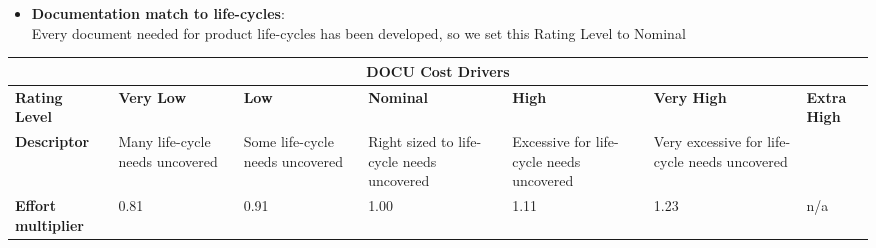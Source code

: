 \begin{itemize}
\item \textbf{Documentation match to life-cycles}:\\
Every document needed for product life-cycles has been developed, so we set this Rating Level to Nominal
\end{itemize}
\hspace*{-3cm}\begin{tabular}{|p{3cm}|p{2cm}|p{2cm}|p{2cm}|p{2cm}|p{2cm}|p{2cm}|}
\hline
\multicolumn{7}{|c|}{\textbf{DOCU Cost Drivers}}\\
\hline
\hline
\textbf{Rating Level} & \textbf{Very Low} & \textbf{Low} & \textbf{Nominal} & \textbf{High} & \textbf{Very High} & \textbf{Extra High}\\
\hline
\textbf{Descriptor} & Many life-cycle needs uncovered & Some life-cycle needs uncovered & Right sized to life-cycle needs uncovered & Excessive for life-cycle needs uncovered & Very excessive for life-cycle needs uncovered & \\
\hline
\textbf{Effort multiplier} & 0.81 & 0.91 & 1.00 & 1.11 & 1.23 & n/a\\
\hline 
\end{tabular}